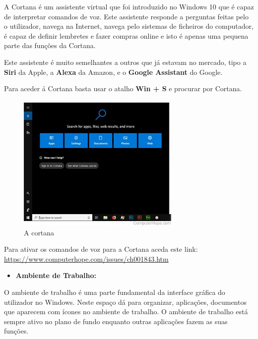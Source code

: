 \documentclass{report}
\begin{document}
A Cortana é um assistente virtual que foi introduzido no Windows 10 que é capaz de interpretar comandos de voz. Este assistente responde a perguntas feitas pelo o utilizador, navega na Internet, navega pelo sistemas de ficheiros do computador, é capaz de definir lembretes e fazer compras online e isto é apenas uma pequena parte das funções da Cortana.

Este assistente é muito semelhantes a outros que já estavam no mercado, tipo a \textbf{Siri} da Apple, a \textbf{Alexa} da Amazon, e o \textbf{Google Assistant} do Google.

\vspace{10mm}

Para aceder á Cortana basta usar o atalho \textbf{Win + S} e procurar por Cortana.

\begin{figure}[h!]
\includegraphics[width=0.7\textwidth]{cortana-win10.jpg}
\centering
\caption{A cortana}
\end{figure}

Para ativar os comandos de voz para a Cortana aceda este link: \url{https://www.computerhope.com/issues/ch001843.htm}

\vspace{35mm}

\begin{itemize}
    \item \textbf{Ambiente de Trabalho:}
\end{itemize}

O ambiente de trabalho é uma parte fundamental da interface gráfica do utilizador no Windows. Neste espaço dá para organizar, aplicações, documentos que aparecem com ícones no ambiente de trabalho. O ambiente de trabalho está sempre ativo no plano de fundo enquanto outras aplicações fazem as suas funções.
\end{document}
